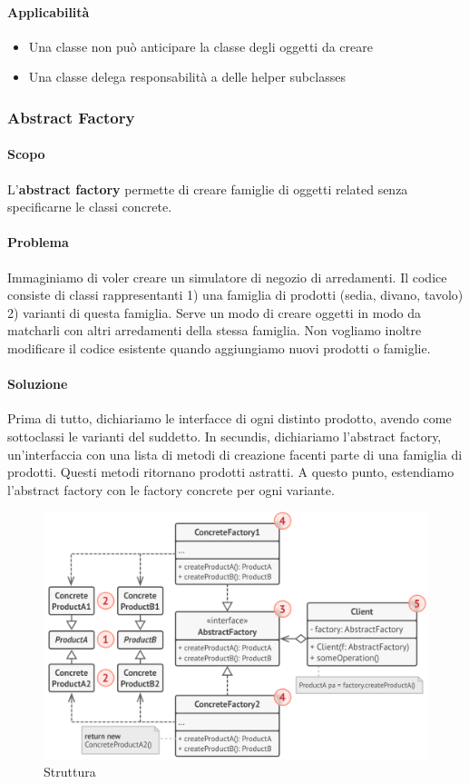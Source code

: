 \documentclass[11pt]{article}
\begin{document}
\paragraph{Applicabilità}
\begin{itemize}
    \item Una classe non può anticipare la classe degli oggetti da creare
    \item Una classe delega responsabilità a delle helper subclasses
\end{itemize}
\subsubsection{Abstract Factory}
\paragraph{Scopo}
L'\textbf{abstract factory} permette di creare famiglie di oggetti related senza specificarne le classi concrete.
\paragraph{Problema}
Immaginiamo di voler creare un simulatore di negozio di arredamenti. Il codice consiste di classi rappresentanti 1) una famiglia di prodotti (sedia, divano, tavolo) 2) varianti di questa famiglia. 
Serve un modo di creare oggetti in modo da matcharli con altri arredamenti della stessa famiglia. Non vogliamo inoltre modificare il codice esistente quando aggiungiamo nuovi prodotti o famiglie. 
\paragraph{Soluzione}
Prima di tutto, dichiariamo le interfacce di ogni distinto prodotto, avendo come sottoclassi le varianti del suddetto. In secundis, dichiariamo l'abstract factory, un'interfaccia con una lista di metodi di creazione facenti parte di una famiglia di prodotti. Questi metodi ritornano prodotti astratti. A questo punto, estendiamo l'abstract factory con le factory concrete per ogni variante. 
\begin{figure}[H]
    \centering
    \includegraphics[width=\linewidth]{res/teoria/AbstractFactory.png}
    \caption{Struttura}
\end{figure}
\end{document}
